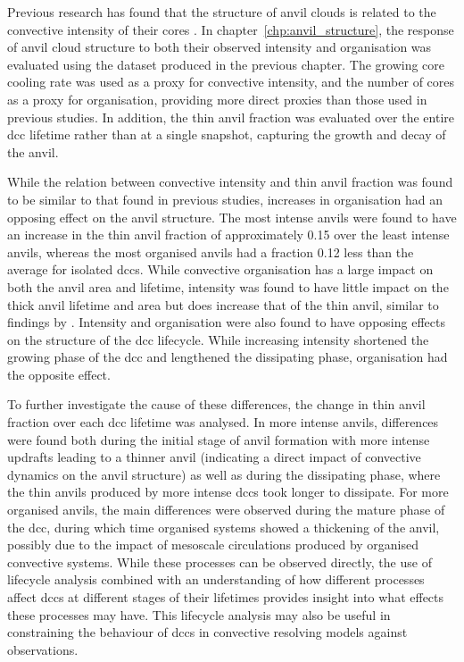 
Previous research has found that the structure of anvil clouds is related to the convective intensity of their cores \citep{protopapadaki_upper_2017, takahashi_relationships_2017}.
In chapter~\ref{chp:anvil_structure}, the response of anvil cloud structure to both their observed intensity and organisation was evaluated using the dataset produced in the previous chapter.
The growing core cooling rate was used as a proxy for convective intensity, and the number of cores as a proxy for organisation, providing more direct proxies than those used in previous studies.
In addition, the thin anvil fraction was evaluated over the entire \acrshort{dcc} lifetime rather than at a single snapshot, capturing the growth and decay of the anvil.

While the relation between convective intensity and thin anvil fraction was found to be similar to that found in previous studies, increases in organisation had an opposing effect on the anvil structure.
The most intense anvils were found to have an increase in the thin anvil fraction of approximately 0.15 over the least intense anvils, whereas the most organised anvils had a fraction 0.12 less than the average for isolated \acrshort{dcc}s.
While convective organisation has a large impact on both the anvil area and lifetime, intensity was found to have little impact on the thick anvil lifetime and area but does increase that of the thin anvil, similar to findings by \citet{sokol_greater_2024}.
Intensity and organisation were also found to have opposing effects on the structure of the \acrshort{dcc} lifecycle.
While increasing intensity shortened the growing phase of the \acrshort{dcc} and lengthened the dissipating phase, organisation had the opposite effect.

To further investigate the cause of these differences, the change in thin anvil fraction over each \acrshort{dcc} lifetime was analysed.
In more intense anvils, differences were found both during the initial stage of anvil formation with more intense updrafts leading to a thinner anvil (indicating a direct impact of convective dynamics on the anvil structure) as well as during the dissipating phase, where the thin anvils produced by more intense \acrshort{dcc}s took longer to dissipate.
For more organised anvils, the main differences were observed during the mature phase of the \acrshort{dcc}, during which time organised systems showed a thickening of the anvil, possibly due to the impact of mesoscale circulations produced by organised convective systems.
While these processes can be observed directly, the use of lifecycle analysis combined with an understanding of how different processes affect \acrshort{dcc}s at different stages of their lifetimes provides insight into what effects these processes may have.
This lifecycle analysis may also be useful in constraining the behaviour of \acrshort{dcc}s in convective resolving models against observations.

